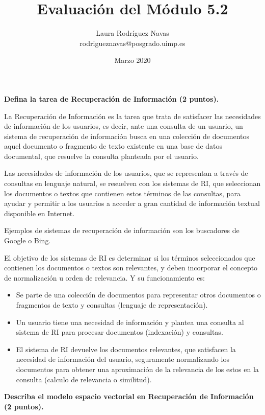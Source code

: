 \documentclass[11pt]{exam}
\title{Evaluación del Módulo 5.2}
\author{Laura Rodríguez Navas \\ rodrigueznavas@posgrado.uimp.es}
\date{Marzo 2020}
\begin{document}
	
\maketitle

\begin{questions}

{\bf \question Defina la tarea de Recuperación de Información (2 puntos).}

La Recuperación de Información es la tarea que trata de satisfacer las necesidades de información de los usuarios, es decir, ante una consulta de un usuario, un sistema de recuperación de información busca en una colección de documentos aquel documento o fragmento de texto existente en una base de datos documental, que resuelve la consulta planteada por el usuario. 

Las necesidades de información de los usuarios, que se representan a través de consultas en lenguaje natural, se resuelven con los sistemas de RI, que seleccionan los documentos o textos que contienen estos términos de las consultas, para ayudar y permitir a los usuarios a acceder a gran cantidad de información textual disponible en Internet.

Ejemplos de sistemas de recuperación de información son los buscadores de Google o Bing.

El objetivo de los sistemas de RI es determinar si los términos seleccionados que contienen los documentos o textos son relevantes, y deben incorporar el concepto de normalización u orden de relevancia. Y su funcionamiento es:

\begin{itemize}
	\item Se parte de una colección de documentos para representar otros documentos o fragmentos de texto y consultas (lenguaje de representación).
	\item Un usuario tiene una necesidad de información y plantea una consulta al sistema de RI para procesar documentos (indexación) y consultas.
	\item El sistema de RI devuelve los documentos relevantes, que satisfacen la necesidad de información del usuario, seguramente normalizando los documentos para obtener una aproximación de la relevancia de los estos en la consulta (calculo de relevancia o similitud).
\end{itemize}

{\bf \question Describa el modelo espacio vectorial en Recuperación de Información (2 puntos).}


\end{questions}
\end{document}
